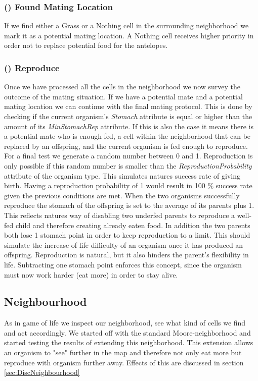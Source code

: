 \documentclass[11pt]{article}
\begin{document}
\addtocounter{protocolCounter}{1}
\subsubsection{() Found Mating Location}
If we find either a Grass or a Nothing cell in the surrounding neighborhood we mark it as a potential mating location. A Nothing cell receives higher priority in order not to replace potential food for the antelopes. 


\addtocounter{protocolCounter}{1}
\subsubsection{() Reproduce}
\label{tab:reproduction}
Once we have processed all the cells in the neighborhood we now survey the outcome of the mating situation. If we have a potential mate and a potential mating location we can continue with the final mating protocol. This is done by checking if the current organism's {\it Stomach} attribute is equal or higher than the amount of its {\it MinStomachRep} attribute. If this is also the case it means there is a potential mate who is enough fed, a cell within the neighborhood that can be replaced by an offspring, and the current organism is fed enough to reproduce. For a final test we generate a random number between 0 and 1. Reproduction is only possible if this random number is smaller than the {\it ReproductionProbability} attribute of the organism type. This simulates natures success rate of giving birth. Having a reproduction probability of 1 would result in 100 $\%$ success rate given the previous conditions are met. When the two organisms successfully reproduce the stomach of the offspring is set to the average of its parents plus 1. This reflects natures way of disabling two underfed parents to reproduce a well-fed child and therefore creating already eaten food. In addition the two parents both lose 1 stomach point in order to keep reproduction to a limit. This should simulate the increase of life difficulty of an organism once it has produced an offspring. Reproduction is natural, but it also hinders the parent's flexibility in life. Subtracting one stomach point enforces this concept, since the organism must now work harder (eat more) in order to stay alive.

\subsection{Neighbourhood}
\label{sec:neighbourhood}
As in game of life we inspect our neighborhood, see what kind of cells we find and act accordingly. 
We started off with the standard Moore-neighborhood and started testing the results of extending this neighborhood. This extension allows an organism to "see" further in the map and therefore not only eat more but reproduce with organism further away. Effects of this are discussed in section \ref{sec:DiscNeighbourhood}
\end{document}
